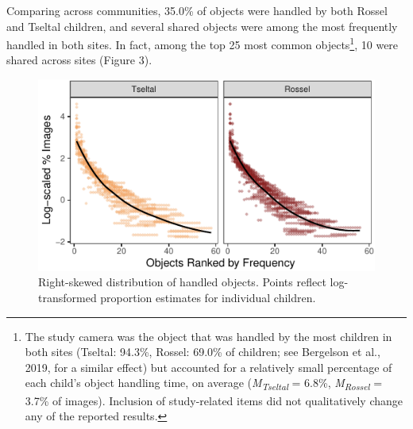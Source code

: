 \documentclass[10pt, letterpaper]{article}
\newenvironment{CodeChunk}{}{}
\begin{document}
Comparing across communities, 35.0\% of objects were handled by both
Rossel and Tseltal children, and several shared objects were among the
most frequently handled in both sites. In fact, among the top 25 most
common objects\footnote{The study camera was the object that was handled
  by the most children in both sites (Tseltal: 94.3\%, Rossel: 69.0\% of
  children; see Bergelson et al., 2019, for a similar effect) but
  accounted for a relatively small percentage of each child's object
  handling time, on average (\emph{M}\textsubscript{\emph{Tseltal}} =
  6.8\%, \emph{M}\textsubscript{\emph{Rossel}} = 3.7\% of images).
  Inclusion of study-related items did not qualitatively change any of
  the reported results.}, 10 were shared across sites (Figure 3).

\begin{CodeChunk}
\begin{figure}[h]

{\centering \includegraphics{figs/zipfian-objects-fig-1} 

}

\caption[Right-skewed distribution of handled objects]{Right-skewed distribution of handled objects. Points reflect log-transformed proportion estimates for individual children.}\label{fig:zipfian-objects-fig}
\end{figure}
\end{CodeChunk}
\end{document}
